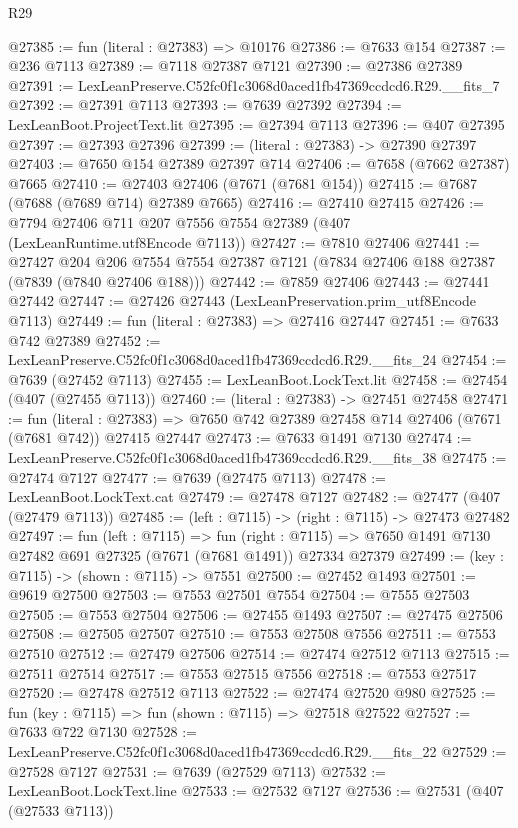 \begin{lexlean}{R29}
\begin{coremodule}
@27385 := fun (literal : @27383) => @10176
@27386 := @7633 @154
@27387 := @236 @7113
@27389 := @7118 @27387 @7121
@27390 := @27386 @27389
@27391 := LexLeanPreserve.C52fc0f1c3068d0aced1fb47369ccdcd6.R29.__fits_7
@27392 := @27391 @7113
@27393 := @7639 @27392
@27394 := LexLeanBoot.ProjectText.lit
@27395 := @27394 @7113
@27396 := @407 @27395
@27397 := @27393 @27396
@27399 := (literal : @27383) -> @27390 @27397
@27403 := @7650 @154 @27389 @27397 @714
@27406 := @7658 (@7662 @27387) @7665
@27410 := @27403 @27406 (@7671 (@7681 @154))
@27415 := @7687 (@7688 (@7689 @714) @27389 @7665)
@27416 := @27410 @27415
@27426 := @7794 @27406 @711 @207 @7556 @7554 @27389 (@407 (LexLeanRuntime.utf8Encode @7113))
@27427 := @7810 @27406
@27441 := @27427
    @204
    @206
    @7554
    @7554
    @27387
    @7121
    (@7834 @27406 @188 @27387 (@7839 (@7840 @27406 @188)))
@27442 := @7859 @27406
@27443 := @27441 @27442
@27447 := @27426 @27443 (LexLeanPreservation.prim_utf8Encode @7113)
@27449 := fun (literal : @27383) => @27416 @27447
@27451 := @7633 @742 @27389
@27452 := LexLeanPreserve.C52fc0f1c3068d0aced1fb47369ccdcd6.R29.__fits_24
@27454 := @7639 (@27452 @7113)
@27455 := LexLeanBoot.LockText.lit
@27458 := @27454 (@407 (@27455 @7113))
@27460 := (literal : @27383) -> @27451 @27458
@27471 := fun (literal : @27383) =>
  @7650 @742 @27389 @27458 @714 @27406 (@7671 (@7681 @742)) @27415 @27447
@27473 := @7633 @1491 @7130
@27474 := LexLeanPreserve.C52fc0f1c3068d0aced1fb47369ccdcd6.R29.__fits_38
@27475 := @27474 @7127
@27477 := @7639 (@27475 @7113)
@27478 := LexLeanBoot.LockText.cat
@27479 := @27478 @7127
@27482 := @27477 (@407 (@27479 @7113))
@27485 := (left : @7115) -> (right : @7115) -> @27473 @27482
@27497 := fun (left : @7115) =>
  fun (right : @7115) => @7650 @1491 @7130 @27482 @691 @27325 (@7671 (@7681 @1491)) @27334 @27379
@27499 := (key : @7115) -> (shown : @7115) -> @7551
@27500 := @27452 @1493
@27501 := @9619 @27500
@27503 := @7553 @27501 @7554
@27504 := @7555 @27503
@27505 := @7553 @27504
@27506 := @27455 @1493
@27507 := @27475 @27506
@27508 := @27505 @27507
@27510 := @7553 @27508 @7556
@27511 := @7553 @27510
@27512 := @27479 @27506
@27514 := @27474 @27512 @7113
@27515 := @27511 @27514
@27517 := @7553 @27515 @7556
@27518 := @7553 @27517
@27520 := @27478 @27512 @7113
@27522 := @27474 @27520 @980
@27525 := fun (key : @7115) => fun (shown : @7115) => @27518 @27522
@27527 := @7633 @722 @7130
@27528 := LexLeanPreserve.C52fc0f1c3068d0aced1fb47369ccdcd6.R29.__fits_22
@27529 := @27528 @7127
@27531 := @7639 (@27529 @7113)
@27532 := LexLeanBoot.LockText.line
@27533 := @27532 @7127
@27536 := @27531 (@407 (@27533 @7113))

\end{coremodule}
\end{lexlean}
